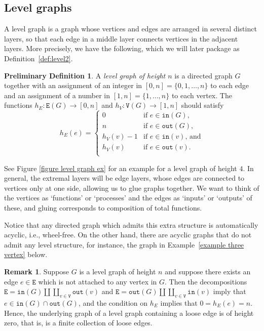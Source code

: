 \documentclass{amsart}
\numberwithin{theorem}{subsection}
\theoremstyle{definition}
\newtheorem{predef}[theorem]{Preliminary Definition}
\newtheorem{remark}[theorem]{Remark}
\newcommand{\out}{\mathtt{out}}
\newcommand{\inp}{\mathtt{in}}
\newcommand{\edge}{\mathtt{E}}
\newcommand{\vertex}{\mathtt{V}}
\begin{document}
\subsection{Level graphs}\label{subsec levelg}
A level graph is a graph whose vertices and edges are arranged in several distinct layers, so that each edge in a middle layer connects vertices in the adjacent layers.
More precisely, we have the following, which we will later package as Definition~\ref{def:level2}.
\begin{predef}\label{def:level1}
	A \emph{level graph of height $n$} is a directed graph $G$ together with an assignment of an integer in $[0,n] = \{0,1,\dots, n\}$ to each edge and an assignment of a number in $[1,n]=\{1, \dots, n\}$ to each vertex.
	The functions $h_E\colon \edge(G) \to [0,n]$ and $h_V\colon \vertex(G) \to [1,n]$ should satisfy
	\[
		h_E(e) = \begin{cases}
			0 & \text{if } e\in \inp(G), \\
			n & \text{if } e\in \out(G), \\
			h_V(v) - 1 & \text{if $e\in \inp(v)$, and} \\
			h_V(v) & \text{if } e\in \out(v). \\
		\end{cases}
	\]
\end{predef}
See Figure \ref{figure level graph ex} for an example for a level graph of height $4$.
In general, the extremal layers will be edge layers, whose edges are connected to vertices only at one side, allowing us to glue graphs together.
We want to think of the vertices as `functions' or `processes' and the edges as `inputs' or `outputs' of these, and gluing corresponds to composition of total functions.

Notice that any directed graph which admits this extra structure is automatically acyclic, i.e., wheel-free.
On the other hand, there are acyclic graphs that do not admit any level structure, for instance, the graph in Example~\ref{example three vertex} below.

\begin{remark}\label{remark: loose edge}
Suppose $G$ is a level graph of height $n$ and suppose there exists an edge $e\in \edge$ which is not attached to any vertex in $G$.
Then the decompositions $\edge = \inp(G) \amalg \coprod_{v\in \vertex} \out(v)$ and $ \edge = \out(G) \amalg \coprod_{v\in \vertex} \inp(v)$ imply that $e\in \inp(G)\cap \out(G)$, and the condition on $h_E$ implies that $0=h_E(e)=n$.
Hence, the underlying graph of a level graph containing a loose edge is of height zero, that is, is a finite collection of loose edges.
\end{remark}
\end{document}
